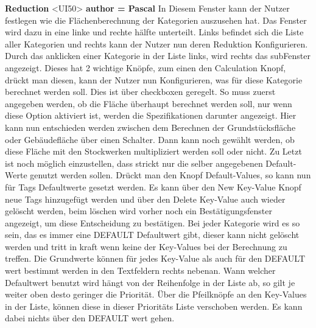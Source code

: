 \documentclass[parskip=full]{scrartcl} %
\begin{document}
\textbf{Reduction }<UI50>\textbf{ author = Pascal}
In Diesem Fenster kann der Nutzer festlegen wie die Flächenberechnung der Kategorien auszusehen hat.
Das Fenster wird dazu in eine linke und rechte hälfte unterteilt.
Links befindet sich die Liste aller Kategorien und rechts kann der Nutzer nun deren Reduktion Konfigurieren.
Durch das anklicken einer Kategorie in der Liste links, wird rechts das subFenster angezeigt. Dieses hat 2 wichtige Knöpfe, zum einen den Calculation Knopf, drückt man diesen, kann der Nutzer nun Konfigurieren, was für diese Kategorie berechnet werden soll. Dies ist über checkboxen geregelt. So muss zuerst angegeben werden, ob die Fläche überhaupt berechnet werden soll, nur wenn diese Option aktiviert ist, werden die Spezifikationen darunter angezeigt. Hier kann nun entschieden werden zwischen dem Berechnen der Grundstücksfläche oder Gebäudefläche über einen Schalter. Dann kann noch gewählt werden, ob diese Fläche mit den Stockwerken multipliziert werden soll oder nicht. Zu Letzt ist noch möglich einzustellen, dass strickt nur die selber angegebenen
Default-Werte genutzt werden sollen.
Drückt man den Knopf Default-Values, so kann nun für Tags Defaultwerte gesetzt werden. Es kann über den New Key-Value Knopf neue Tags hinzugefügt werden und über den Delete Key-Value auch wieder gelöscht werden, beim löschen wird vorher noch ein Bestätigungsfenster angezeigt, um diese Entscheidung zu bestätigen.
Bei jeder Kategorie wird es so sein, das es immer eine DEFAULT Defaultwert gibt, dieser kann nicht gelöscht werden und tritt in kraft wenn keine der Key-Values bei der Berechnung zu treffen.
Die Grundwerte können für jedes Key-Value als auch für den DEFAULT wert bestimmt werden in den Textfeldern rechts nebenan.
Wann welcher Defaultwert benutzt wird hängt von der Reihenfolge in der Liste ab, so gilt je weiter oben desto geringer die Priorität. Über die Pfeilknöpfe an den Key-Values in der Liste, können diese in dieser Prioritäts Liste verschoben werden. Es kann dabei nichts über den DEFAULT wert gehen.
\end{document}
